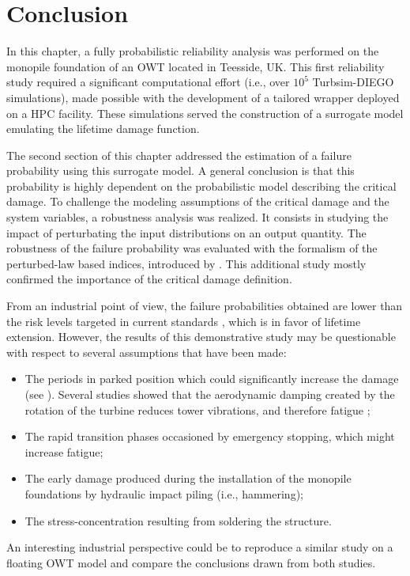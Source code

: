 \newpage
\section{Conclusion}

In this chapter, a fully probabilistic reliability analysis was performed on the monopile foundation of an OWT located in Teesside, UK. 
This first reliability study required a significant computational effort (i.e., over $10^5$ Turbsim-DIEGO simulations), made possible with the development of a tailored wrapper deployed on a HPC facility. 
These simulations served the construction of a surrogate model emulating the lifetime damage function. 

The second section of this chapter addressed the estimation of a failure probability using this surrogate model. 
A general conclusion is that this probability is highly dependent on the probabilistic model describing the critical damage. 
To challenge the modeling assumptions of the critical damage and the system variables, a robustness analysis was realized. 
It consists in studying the impact of perturbating the input distributions on an output quantity.   
The robustness of the failure probability was evaluated with the formalism of the perturbed-law based indices, introduced by \citet{lemaitre_2015_PLI}.
This additional study mostly confirmed the importance of the critical damage definition. 

From an industrial point of view, the failure probabilities obtained are lower than the risk levels targeted in current standards \citep{wang_2022_owt_reliability_review}, which is in favor of lifetime extension. 
However, the results of this demonstrative study may be questionable with respect to several assumptions that have been made: 
\begin{itemize}
    \item The periods in parked position which could significantly increase the damage (see \citealp{velarde_2020_fatigue_reliability}). 
    Several studies showed that the aerodynamic damping created by the rotation of the turbine reduces tower vibrations, and therefore fatigue \citep{liu_2017_damping};
    \item The rapid transition phases occasioned by emergency stopping, which might increase fatigue;
    \item The early damage produced during the installation of the monopile foundations by hydraulic impact piling (i.e., hammering);  
    \item The stress-concentration resulting from soldering the structure.
\end{itemize} 
An interesting industrial perspective could be to reproduce a similar study on a floating OWT model and compare the conclusions drawn from both studies.  

